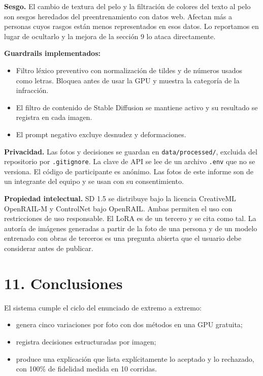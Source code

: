 \documentclass[conference]{IEEEtran}
\begin{document}
\textbf{Sesgo.} El cambio de textura del pelo y la filtración de colores del texto al pelo son sesgos heredados del preentrenamiento con datos web. Afectan más a personas cuyos rasgos están menos representados en esos datos. Lo reportamos en lugar de ocultarlo y la mejora de la sección 9 lo ataca directamente.

\textbf{Guardrails implementados:}

\begin{itemize}
\item Filtro léxico preventivo con normalización de tildes y de números usados como letras. Bloquea antes de usar la GPU y muestra la categoría de la infracción.
\item El filtro de contenido de Stable Diffusion se mantiene activo y su resultado se registra en cada imagen.
\item El prompt negativo excluye desnudez y deformaciones.
\end{itemize}

\textbf{Privacidad.} Las fotos y decisiones se guardan en \texttt{data/processed/}, excluida del repositorio por \texttt{.gitignore}. La clave de API se lee de un archivo \texttt{.env} que no se versiona. El código de participante es anónimo. Las fotos de este informe son de un integrante del equipo y se usan con su consentimiento.

\textbf{Propiedad intelectual.} SD 1.5 se distribuye bajo la licencia CreativeML OpenRAIL-M y ControlNet bajo OpenRAIL. Ambas permiten el uso con restricciones de uso responsable. El LoRA es de un tercero y se cita como tal. La autoría de imágenes generadas a partir de la foto de una persona y de un modelo entrenado con obras de terceros es una pregunta abierta que el usuario debe considerar antes de publicar.

\section*{11. Conclusiones}

El sistema cumple el ciclo del enunciado de extremo a extremo:

\begin{itemize}
\item genera cinco variaciones por foto con dos métodos en una GPU gratuita;
\item registra decisiones estructuradas por imagen;
\item produce una explicación que lista explícitamente lo aceptado y lo rechazado, con 100\% de fidelidad medida en 10 corridas.
\end{itemize}
\end{document}
